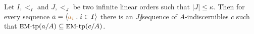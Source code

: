 \documentclass[creche.tex]{subfiles}
\begin{document}
% 
% 
% 
% 



\begin{theorem}\label{thm_EM}
  Let $I,<_I$ and $J,<_J$ be two infinite linear orders such that $|J|\le \kappa$. Then for every sequence $a=\langle{\color{brown}a_i}:i\in I\rangle$ there is an $J\jj$sequence of $A$-indiscernibles $c$ such that $\textrm{{\small EM}\mbox{-}tp}(a/A)\subseteq\textrm{{\small EM}\mbox{-}tp}(c/A)$.
\end{theorem}
\end{document}
